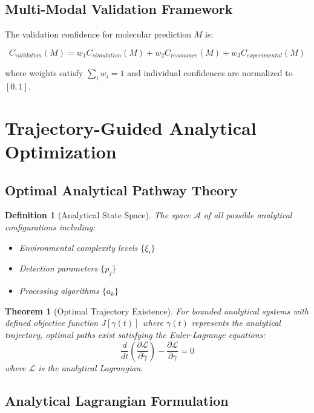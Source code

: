 \documentclass[11pt,a4paper]{article}
\newtheorem{theorem}{Theorem}
\newtheorem{definition}{Definition}
\begin{document}
\subsection{Multi-Modal Validation Framework}

The validation confidence for molecular prediction $M$ is:

\begin{equation}
C_{validation}(M) = w_1 C_{simulation}(M) + w_2 C_{resonance}(M) + w_3 C_{experimental}(M)
\end{equation}

where weights satisfy $\sum_i w_i = 1$ and individual confidences are normalized to $[0,1]$.

\section{Trajectory-Guided Analytical Optimization}

\subsection{Optimal Analytical Pathway Theory}

\begin{definition}[Analytical State Space]
The space $\mathcal{A}$ of all possible analytical configurations including:
\begin{itemize}
\item Environmental complexity levels $\{\xi_i\}$
\item Detection parameters $\{p_j\}$
\item Processing algorithms $\{a_k\}$
\end{itemize}
\end{definition}

\begin{theorem}[Optimal Trajectory Existence]
For bounded analytical systems with defined objective function $J[\gamma(t)]$ where $\gamma(t)$ represents the analytical trajectory, optimal paths exist satisfying the Euler-Lagrange equations:
\begin{equation}
\frac{d}{dt}\left(\frac{\partial \mathcal{L}}{\partial \dot{\gamma}}\right) - \frac{\partial \mathcal{L}}{\partial \gamma} = 0
\end{equation}
where $\mathcal{L}$ is the analytical Lagrangian.
\end{theorem}

\subsection{Analytical Lagrangian Formulation}
\end{document}
